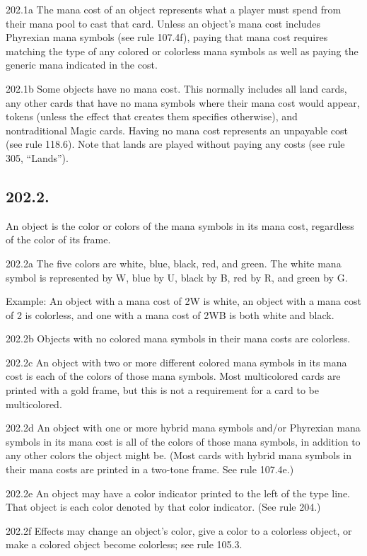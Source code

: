 202.1a The mana cost of an object represents what a player must spend from their mana pool to cast that card. Unless an object’s mana cost includes Phyrexian mana symbols (see rule 107.4f), paying that mana cost requires matching the type of any colored or colorless mana symbols as well as paying the generic mana indicated in the cost.

202.1b Some objects have no mana cost. This normally includes all land cards, any other cards that have no mana symbols where their mana cost would appear, tokens (unless the effect that creates them specifies otherwise), and nontraditional Magic cards. Having no mana cost represents an unpayable cost (see rule 118.6). Note that lands are played without paying any costs (see rule 305, “Lands”).

\subsection*{202.2.}
An object is the color or colors of the mana symbols in its mana cost, regardless of the color of its frame.

202.2a The five colors are white, blue, black, red, and green. The white mana symbol is represented by {W}, blue by {U}, black by {B}, red by {R}, and green by {G}.

Example: An object with a mana cost of {2}{W} is white, an object with a mana cost of {2} is colorless, and one with a mana cost of {2}{W}{B} is both white and black.

202.2b Objects with no colored mana symbols in their mana costs are colorless.

202.2c An object with two or more different colored mana symbols in its mana cost is each of the colors of those mana symbols. Most multicolored cards are printed with a gold frame, but this is not a requirement for a card to be multicolored.

202.2d An object with one or more hybrid mana symbols and/or Phyrexian mana symbols in its mana cost is all of the colors of those mana symbols, in addition to any other colors the object might be. (Most cards with hybrid mana symbols in their mana costs are printed in a two-tone frame. See rule 107.4e.)

202.2e An object may have a color indicator printed to the left of the type line. That object is each color denoted by that color indicator. (See rule 204.)

202.2f Effects may change an object’s color, give a color to a colorless object, or make a colored object become colorless; see rule 105.3.

